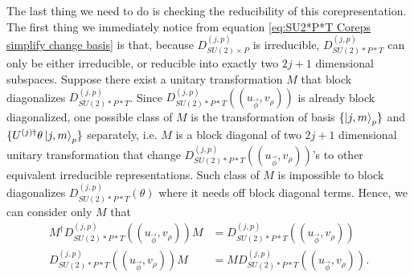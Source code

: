 \documentclass[preprint, 12pt]{revtex4-2}
\numberwithin{equation}{section}
\begin{document}
The last thing we need to do is checking the reducibility of this corepresentation. The first thing we immediately notice from equation \ref{eq:SU2*P*T Coreps simplify change basis} is that, because $D_{SU(2)\times P}^{(j,p)}$ is irreducible, $D_{SU(2)\ast P\ast T}^{(j,p)}$ can only be either irreducible, or reducible into exactly two $2j+1$ dimensional subspaces. Suppose there exist a unitary transformation $M$ that block diagonalizes $D_{SU(2)\ast P\ast T}^{(j,p)}$. Since $D_{SU(2)\ast P\ast T}^{(j,p)}((u_{\vec{\phi}}, v_\rho))$ is already block diagonalized, one possible class of $M$ is the transformation of basis $\{\ket{j,m}_p\}$ and $\{U^{(j)\dagger}\theta\ket{j,m}_p\}$ separately, i.e. $M$ is a block diagonal of two $2j+1$ dimensional unitary transformation that change $D_{SU(2)\ast P\ast T}^{(j,p)}((u_{\vec{\phi}}, v_\rho))$'s to other equivalent irreducible representations. Such class of $M$ is impossible to block diagonalizes $D_{SU(2)\ast P\ast T}^{(j,p)}(\theta)$ where it needs off block diagonal terms. Hence, we can consider only $M$ that
\begin{equation}\label{eq:M block diagonalize SU2*P}
    \begin{aligned}
        M^\dagger D_{SU(2)\ast P\ast T}^{(j,p)}((u_{\vec{\phi}}, v_\rho))M &= D_{SU(2)\ast P\ast T}^{(j,p)}((u_{\vec{\phi}}, v_\rho)) \\
        D_{SU(2)\ast P\ast T}^{(j,p)}((u_{\vec{\phi}}, v_\rho))M &= MD_{SU(2)\ast P\ast T}^{(j,p)}((u_{\vec{\phi}}, v_\rho)).
    \end{aligned}
\end{equation}
\end{document}
